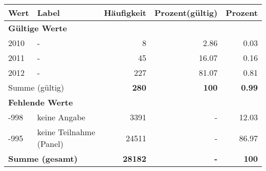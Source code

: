      \begin{longtable}{lXrrr}
     \toprule
     \textbf{Wert} & \textbf{Label} & \textbf{Häufigkeit} & \textbf{Prozent(gültig)} & \textbf{Prozent} \\
     \endhead
     \midrule
     \multicolumn{5}{l}{\textbf{Gültige Werte}}\\

     2010 &
     \multicolumn{1}{X}{ -  } &


       \num{8} &
       \num[round-mode=places,round-precision=2]{2.86} &
         \num[round-mode=places,round-precision=2]{0.03} \\

     2011 &
     \multicolumn{1}{X}{ -  } &


       \num{45} &
       \num[round-mode=places,round-precision=2]{16.07} &
         \num[round-mode=places,round-precision=2]{0.16} \\

     2012 &
     \multicolumn{1}{X}{ -  } &


       \num{227} &
       \num[round-mode=places,round-precision=2]{81.07} &
         \num[round-mode=places,round-precision=2]{0.81} \\
     \midrule
     \multicolumn{2}{l}{Summe (gültig)} &
       \textbf{\num{280}} &
     \textbf{100} &
       \textbf{\num[round-mode=places,round-precision=2]{0.99}} \\
     \multicolumn{5}{l}{\textbf{Fehlende Werte}}\\
       -998 &
       keine Angabe &
         \num{3391} &
        - &
         \num[round-mode=places,round-precision=2]{12.03} \\
       -995 &
       keine Teilnahme (Panel) &
         \num{24511} &
        - &
         \num[round-mode=places,round-precision=2]{86.97} \\
     \midrule
     \multicolumn{2}{l}{\textbf{Summe (gesamt)}} &
          \textbf{\num{28182}} &
        \textbf{-} &
        \textbf{100} \\
     \bottomrule
     \end{longtable}
     
